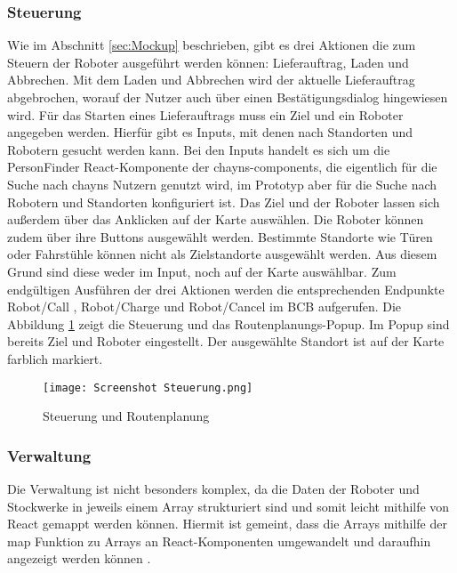 \subsubsection{Steuerung}
Wie im Abschnitt \ref{sec:Mockup} beschrieben, gibt es drei Aktionen die zum Steuern der Roboter ausgeführt werden können: Lieferauftrag, Laden und Abbrechen. Mit dem Laden und Abbrechen wird der aktuelle Lieferauftrag abgebrochen, worauf der Nutzer auch über einen Bestätigungsdialog hingewiesen wird. Für das Starten eines Lieferauftrags muss ein Ziel und ein Roboter angegeben werden. Hierfür gibt es Inputs, mit denen nach Standorten und Robotern gesucht werden kann. Bei den Inputs handelt es sich um die PersonFinder React-Komponente \cite{ChaynsPersonFinder} der chayns-components, die eigentlich für die Suche nach chayns Nutzern genutzt wird, im Prototyp aber für die Suche nach Robotern und Standorten konfiguriert ist. Das Ziel und der Roboter lassen sich außerdem über das Anklicken auf der Karte auswählen. Die Roboter können zudem über ihre Buttons ausgewählt werden. Bestimmte Standorte wie Türen oder Fahrstühle können nicht als Zielstandorte ausgewählt werden. Aus diesem Grund sind diese weder im Input, noch auf der Karte auswählbar. Zum endgültigen Ausführen der drei Aktionen werden die entsprechenden Endpunkte Robot/Call \cite[Endpunkt~38]{BCBSwagger}, Robot/Charge \cite[Endpunkt~40]{BCBSwagger} und Robot/Cancel \cite[Endpunkt~41]{BCBSwagger} im \ac{BCB} aufgerufen. Die Abbildung \ref{fig:ControlsScreenshot} zeigt die Steuerung und das Routenplanungs-Popup. Im Popup sind bereits Ziel und Roboter eingestellt. Der ausgewählte Standort ist auf der Karte farblich markiert.

\begin{figure}[H]
    \caption{Steuerung und Routenplanung}\label{fig:ControlsScreenshot}
    \texttt{[image: Screenshot Steuerung.png]}
\end{figure}

\subsubsection{Verwaltung}
Die Verwaltung ist nicht besonders komplex, da die Daten der Roboter und Stockwerke in jeweils einem Array strukturiert sind und somit leicht mithilfe von React gemappt werden können. Hiermit ist gemeint, dass die Arrays mithilfe der map Funktion zu Arrays an React-Komponenten umgewandelt und daraufhin angezeigt werden können \cite[S.~35-36]{Boduch2020}.

